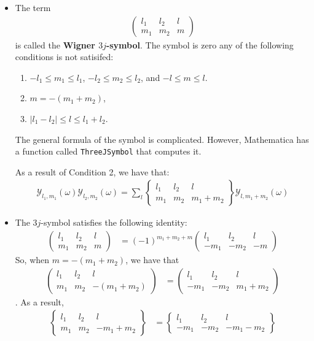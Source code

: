 \documentclass[10pt]{article}
\begin{document}
\begin{itemize}
		\item The term
		\begin{align*}
			\begin{pmatrix}
				l_1 & l_2 & l \\
				m_1 & m_2 & m
			\end{pmatrix}
		\end{align*}
		is called the \textbf{Wigner $3j$-symbol}.  The symbol is zero any of the following conditions is not satisifed:
		\begin{enumerate}
			\item $-l_1 \leq m_1 \leq l_1$, $-l_2 \leq m_2 \leq l_2$, and $-l \leq m \leq l$.
			\item $m = -(m_1 + m _2)$,
			\item $|l_1-l_2| \leq l \leq l_1+l_2$.
		\end{enumerate}
		The general formula of the symbol is complicated.  However, Mathematica has a function called \texttt{ThreeJSymbol} that computes it.

		As a result of Condition 2, we have that:
		\begin{align*}
			\mathcal{Y}_{l_1, m_1}(\omega) \mathcal{Y}_{l_2, m_2}(\omega) 
			= \sum_{l}
			\begin{Bmatrix}
				l_1 & l_2 & l \\ m_1 & m_2 & m_1+m_2
			\end{Bmatrix}
			\mathcal{Y}_{l,m_1+m_2}(\omega)
		\end{align*}

		\item The $3j$-symbol satisfies the following identity:
		\begin{align*}
			\begin{pmatrix}
				l_1 & l_2 & l \\
				m_1 & m_2 & m
			\end{pmatrix}
			&= (-1)^{m_1 + m_2 + m} \begin{pmatrix}
				l_1 & l_2 & l \\
				-m_1 & -m_2 & -m
			\end{pmatrix}
		\end{align*}
		So, when $m = -(m_1+m_2)$, we have that
		\begin{align*}
			\begin{pmatrix}
				l_1 & l_2 & l \\
				m_1 & m_2 & -(m_1 + m_2)
			\end{pmatrix}
			&= \begin{pmatrix}
				l_1 & l_2 & l \\
				-m_1 & -m_2 & m_1 + m_2
			\end{pmatrix}
		\end{align*}.
		As a result,
		\begin{align*}
			\begin{Bmatrix}
				l_1 & l_2 & l \\
				m_1 & m_2 & -m_1 + m_2
			\end{Bmatrix}
			&= \begin{Bmatrix}
				l_1 & l_2 & l \\
				-m_1 & -m_2 & -m_1 - m_2
			\end{Bmatrix}
		\end{align*}


\end{itemize}
\end{document}

